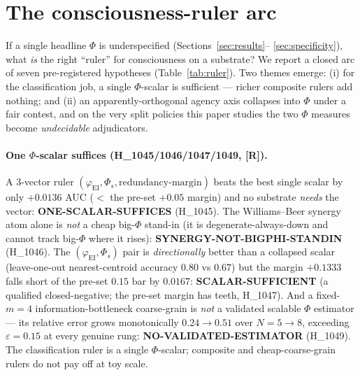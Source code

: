 \documentclass[11pt,a4paper]{article}
\providecommand{\tierRed}{\textcolor{red!70!black}{\textbf{[R]}}}
\newcommand{\faithful}{\ensuremath{\varphi_{\mathrm{EI}}}}
\newcommand{\bigphi}{\ensuremath{\Phi_{s}}}
\begin{document}
\section{The consciousness-ruler arc}
\label{sec:ruler}

If a single headline $\Phi$ is underspecified (Sections~\ref{sec:results}--%
\ref{sec:specificity}), what \emph{is} the right ``ruler'' for consciousness on a
substrate? We report a closed arc of seven pre-registered hypotheses
(Table~\ref{tab:ruler}). Two themes emerge: (i) for the classification job, a
single $\Phi$-scalar is sufficient --- richer composite rulers add nothing; and
(ii) an apparently-orthogonal agency axis collapses into $\Phi$ under a fair
contest, and on the very split policies this paper studies the two $\Phi$
measures become \emph{undecidable} adjudicators.

\paragraph{One $\Phi$-scalar suffices (H\_1045/1046/1047/1049, \tierRed).} A
3-vector ruler $(\faithful,\bigphi,\text{redundancy-margin})$ beats the best
single scalar by only $+0.0136$ AUC ($<$ the pre-set $+0.05$ margin) and no
substrate \emph{needs} the vector: \textbf{ONE-SCALAR-SUFFICES} (H\_1045). The
Williams--Beer synergy atom alone is \emph{not} a cheap big-$\Phi$ stand-in
(it is degenerate-always-down and cannot track big-$\Phi$ where it rises):
\textbf{SYNERGY-NOT-BIGPHI-STANDIN} (H\_1046). The $(\faithful,\bigphi)$ pair is
\emph{directionally} better than a collapsed scalar (leave-one-out
nearest-centroid accuracy $0.80$ vs $0.67$) but the margin $+0.1333$ falls short
of the pre-set $0.15$ bar by $0.0167$: \textbf{SCALAR-SUFFICIENT} (a qualified
closed-negative; the pre-set margin has teeth, H\_1047). And a fixed-$m{=}4$
information-bottleneck coarse-grain is \emph{not} a validated scalable $\Phi$
estimator --- its relative error grows monotonically $0.24\to0.51$ over $N{=}5
{\to}8$, exceeding $\varepsilon{=}0.15$ at every genuine rung:
\textbf{NO-VALIDATED-ESTIMATOR} (H\_1049). The classification ruler is a single
$\Phi$-scalar; composite and cheap-coarse-grain rulers do not pay off at toy
scale.
\end{document}

